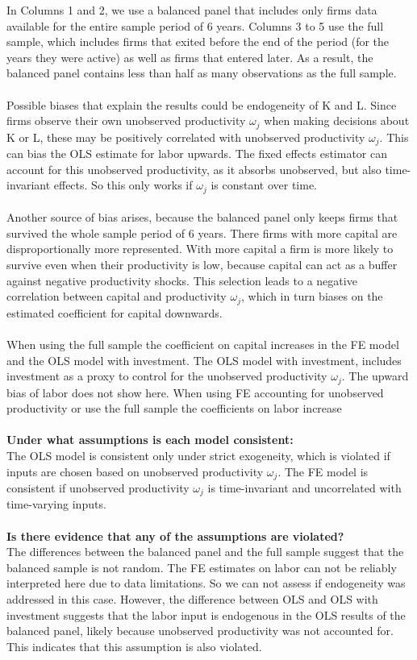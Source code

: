 \documentclass{article}
\begin{document}
\FloatBarrier
In Columns 1 and 2, we use a balanced panel that includes only firms data available for the entire sample period of 6 years. Columns 3 to 5 use the full sample, which includes firms that exited before the end of the period (for the years they were active) as well as firms that entered later. As a result, the balanced panel contains less than half as many observations as the full sample.\\
\\
Possible biases that explain the results could be endogeneity of K and L. Since firms observe their own unobserved productivity $\omega_j$ when making decisions about K or L, these may be positively correlated with unobserved productivity $\omega_j$. This can bias the OLS estimate for labor upwards. The  fixed effects estimator can account for this unobserved productivity, as it absorbs unobserved, but also time-invariant effects. So this only works if $\omega_j$ is constant over time.\\
\\
Another source of bias arises, because the balanced panel only keeps firms that survived the whole sample period of 6 years. There firms with more capital are disproportionally more represented. With more capital a firm is more likely to survive even when their productivity is low, because capital can act as a buffer against negative productivity shocks. This selection leads to a negative correlation between capital and productivity $\omega_j$, which in turn biases on the estimated coefficient for capital downwards.\\
\\
When using the full sample the coefficient on capital increases in the FE model and the OLS model with investment. The OLS model with investment, includes investment as a proxy to control for the unobserved productivity $\omega_j$. The upward bias of labor does not show here. When using FE accounting for unobserved productivity or use the full sample the coefficients on labor increase\\
\\
\textbf{Under what assumptions is each model consistent:}\\
The OLS model is consistent only under strict exogeneity, which is violated if inputs are chosen based on unobserved productivity $\omega_j$.
The FE model is consistent if unobserved productivity $\omega_j$ is time-invariant and uncorrelated with time-varying inputs.\\
\\
\textbf{Is there evidence that any of the assumptions are violated?}\\
The differences between the balanced panel and the full sample suggest that the balanced sample is not random. The FE estimates on labor can not be reliably interpreted here due to data limitations. So we can not assess if endogeneity was addressed in this case. However, the difference between OLS and OLS with investment suggests that the labor input is endogenous in the OLS results of the balanced panel, likely because unobserved productivity was not accounted for. This indicates that this assumption is also violated.
\end{document}
